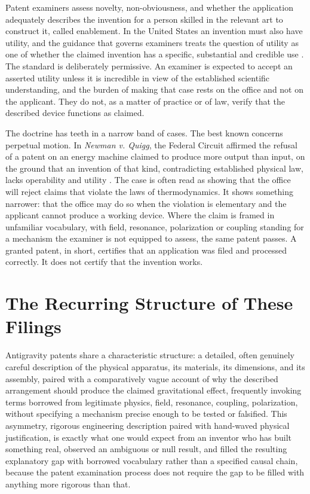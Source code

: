 \documentclass[11pt]{article}
\begin{document}
Patent examiners assess novelty, non-obviousness, and whether the application adequately describes the invention for a person skilled in the relevant art to construct it, called enablement. In the United States an invention must also have utility, and the guidance that governs examiners treats the question of utility as one of whether the claimed invention has a specific, substantial and credible use \cite{MPEP}. The standard is deliberately permissive. An examiner is expected to accept an asserted utility unless it is incredible in view of the established scientific understanding, and the burden of making that case rests on the office and not on the applicant. They do not, as a matter of practice or of law, verify that the described device functions as claimed.

The doctrine has teeth in a narrow band of cases. The best known concerns perpetual motion. In \emph{Newman v. Quigg}, the Federal Circuit affirmed the refusal of a patent on an energy machine claimed to produce more output than input, on the ground that an invention of that kind, contradicting established physical law, lacks operability and utility \cite{Newman1989}. The case is often read as showing that the office will reject claims that violate the laws of thermodynamics. It shows something narrower: that the office may do so when the violation is elementary and the applicant cannot produce a working device. Where the claim is framed in unfamiliar vocabulary, with field, resonance, polarization or coupling standing for a mechanism the examiner is not equipped to assess, the same patent passes. A granted patent, in short, certifies that an application was filed and processed correctly. It does not certify that the invention works.

\section{The Recurring Structure of These Filings}

Antigravity patents share a characteristic structure: a detailed, often genuinely careful description of the physical apparatus, its materials, its dimensions, and its assembly, paired with a comparatively vague account of why the described arrangement should produce the claimed gravitational effect, frequently invoking terms borrowed from legitimate physics, field, resonance, coupling, polarization, without specifying a mechanism precise enough to be tested or falsified. This asymmetry, rigorous engineering description paired with hand-waved physical justification, is exactly what one would expect from an inventor who has built something real, observed an ambiguous or null result, and filled the resulting explanatory gap with borrowed vocabulary rather than a specified causal chain, because the patent examination process does not require the gap to be filled with anything more rigorous than that.
\end{document}
